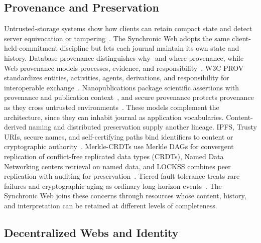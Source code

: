 \subsection{Provenance and Preservation}

Untrusted-storage systems show how clients can retain compact state and detect server equivocation or tampering~\cite{Li2004secure,Mahajan2010depot,Kim2015caelus}. The Synchronic Web adopts the same client-held-commitment discipline but lets each journal maintain its own state and history. Database provenance distinguishes why- and where-provenance, while Web provenance models processes, evidence, and responsibility~\cite{Buneman2001why,Moreau2010foundations,Moreau2010open}. W3C PROV standardizes entities, activities, agents, derivations, and responsibility for interoperable exchange~\cite{Moreau2013prov}. Nanopublications package scientific assertions with provenance and publication context~\cite{Groth2010anatomy}, and secure provenance protects provenance  as they cross untrusted environments~\cite{Hasan2009provenance}. These models complement the architecture, since they can inhabit journal  as application vocabularies. Content-derived naming and distributed preservation supply another lineage. IPFS, Trusty URIs, secure names, and self-certifying paths bind identifiers to content or cryptographic authority~\cite{Benet2014ipfs,Kuhn2014trusty,Haber1997secure,Mazieres1998path}. Merkle-CRDTs use Merkle DAGs for convergent replication of conflict-free replicated data types (CRDTs), Named Data Networking centers retrieval on named data, and LOCKSS combines peer replication with auditing for preservation~\cite{Sanjuan2020merkle,Zhang2014named,Maniatis2005lockss}. Tiered fault tolerance treats rare failures and cryptographic aging as ordinary long-horizon events~\cite{Chun2009tiered}. The Synchronic Web joins these concerns through resources whose content, history, and interpretation can be retained at different levels of completeness.

\subsection{Decentralized Webs and Identity}

